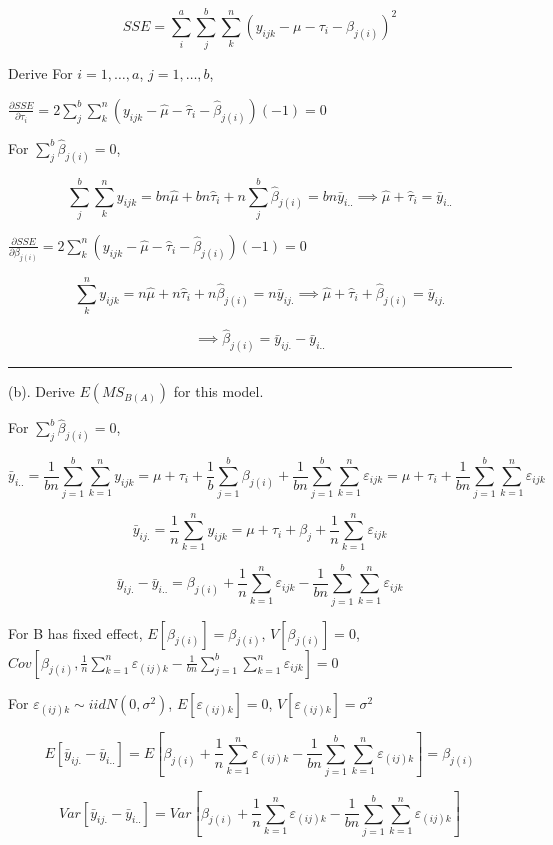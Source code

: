 \documentclass[12pt,]{article}
\begin{document}
\[SSE=\sum_i^a\sum_j^b\sum_k^n(y_{ijk}-\mu-\tau_i-\beta_{j(i)})^2\]

Derive For \(i=1,…,a\), \(j=1,…,b\),

\(\frac{\partial SSE}{\partial \tau_i}=2\sum_j^b\sum_k^n(y_{ijk}-\hat\mu-\hat\tau_i-\hat\beta_{j(i)})(-1)=0\)

For \(\sum_j^b\hat\beta_{j(i)}=0\),

\[\sum_j^b\sum_k^ny_{ijk}=bn\hat\mu+bn\hat\tau_i+n\sum_j^b\hat\beta_{j(i)}=bn\bar y_{i..}\implies \hat\mu+\hat\tau_i=\bar y_{i..}\]

\(\frac{\partial SSE}{\partial \beta_{j(i)}}=2\sum_k^n(y_{ijk}-\hat\mu-\hat\tau_i-\hat\beta_{j(i)})(-1)=0\)

\[\sum_k^ny_{ijk}=n\hat\mu+n\hat\tau_i+n\hat\beta_{j(i)}=n\bar y_{ij.}\implies \hat\mu+\hat\tau_i+\hat\beta_{j(i)}=\bar y_{ij.}\]

\[\implies \hat\beta_{j(i)}=\bar y_{ij.}-\bar y_{i..}\]

\begin{center}\rule{0.5\linewidth}{\linethickness}\end{center}

(b). \textcolor[rgb]{0.7,0.7,0.7}{Derive $E(MS_{B(A)})$ for this model.}

For \(\sum_j^b\hat\beta_{j(i)}=0\),

\[\bar y_{i..}=\frac1{bn}\sum_{j=1}^b\sum_{k=1}^ny_{ijk}=\mu+\tau_{i}+\frac1b \sum_{j=1}^b\beta_{j(i)}+\frac1{bn}\sum_{j=1}^b\sum_{k=1}^n\varepsilon_{ijk}=\mu+\tau_{i}+\frac1{bn}\sum_{j=1}^b\sum_{k=1}^n\varepsilon_{ijk}\]

\[\bar y_{ij.}=\frac1{n}\sum_{k=1}^ny_{ijk}=\mu+\tau_{i}+\beta_j+\frac1{n}\sum_{k=1}^n\varepsilon_{ijk}\]

\[\bar y_{ij.}-\bar y_{i..}=\beta_{j(i)}+\frac1{n}\sum_{k=1}^n\varepsilon_{ijk}-\frac1{bn}\sum_{j=1}^b\sum_{k=1}^n\varepsilon_{ijk}\]

For B has fixed effect, \(E[\beta_{j(i)}]=\beta_{j(i)}\),
\(V[\beta_{j(i)}]=0\),
\(Cov[\beta_{j(i)},\frac1{n}\sum_{k=1}^n\varepsilon_{(ij)k}-\frac1{bn}\sum_{j=1}^b\sum_{k=1}^n\varepsilon_{ijk}]=0\)

For \(\varepsilon_{(ij)k}\sim iid N(0,\sigma^2)\),
\(E[\varepsilon_{(ij)k}]=0\), \(V[\varepsilon_{(ij)k}]=\sigma^2\)

\[E[\bar y_{ij.}-\bar y_{i..}]=E[\beta_{j(i)}+\frac1{n}\sum_{k=1}^n\varepsilon_{(ij)k}-\frac1{bn}\sum_{j=1}^b\sum_{k=1}^n\varepsilon_{(ij)k}]=\beta_{j(i)}\]

\[Var[\bar y_{ij.}-\bar y_{i..}]=Var[\beta_{j(i)}+\frac1{n}\sum_{k=1}^n\varepsilon_{(ij)k}-\frac1{bn}\sum_{j=1}^b\sum_{k=1}^n\varepsilon_{(ij)k}]\]
\end{document}
